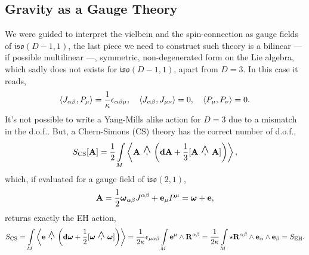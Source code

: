 \documentclass[a0,portrait]{a0poster}
\newcommand{\wedgecomma}{\stackon[1pt]{,}{\smash{\scriptsize$\wedge$}}}
\newcommand{\wedgecomm}[2]{\qty[ #1\ \wedgecomma\ #2 ]}
\begin{document}
\begin{multicols}{2}
\section*{Gravity as a Gauge Theory}

We were guided to interpret the vielbein and the spin-connection as gauge fields of $\mathfrak{iso}(D-1,1)$, the last piece we need 
to construct such theory is a bilinear --- if possible multilinear ---, symmetric, non-degenerated form on the Lie algebra, which sadly does 
not exists for $\mathfrak{iso}(D-1,1)$, apart from $D=3$. In this case it reads,
\[\expval{J_{\alpha\beta},P_\mu}=\frac1\kappa\epsilon_{\alpha\beta\mu},\ \ \ \expval{J_{\alpha\beta},J_{\mu\nu}}=0,\ \ \ \expval{P_\mu,P_\nu}=0.\]
It's not possible to write a Yang-Mills alike action for $D=3$ due to a mismatch in the d.o.f.. But, a Chern-Simons (CS) theory has the correct number of d.o.f.,
\[S_{\textnormal{CS}}\qty[\vb A]=\frac12\int\limits_M\expval{\vb A\ \wedgecomma\ \qty(\vb d{\vb A}+\frac13\wedgecomm{\vb A}{\vb A})},\]
which, if evaluated for a gauge field of $\mathfrak {iso}(2,1)$, \[\vb A = \frac12\boldsymbol\omega_{\alpha\beta}J^{\alpha\beta}+\vb e_\mu P^\mu=\boldsymbol\omega+\vb e,\] returns exactly the EH action,
\[S_{\textnormal{CS}}=\int\limits_M\expval{\vb e\ \wedgecomma\ \qty(\vb d{\boldsymbol\omega}+\frac12\wedgecomm{\boldsymbol\omega}{\boldsymbol\omega})}=\frac{1}{2\kappa}\epsilon_{\mu\alpha\beta}\int\limits_M\vb e^\mu\wedge \vb R^{\alpha\beta}=\frac{1}{2\kappa}\int\limits_M\star\vb R^{\alpha\beta}\wedge \vb e_\alpha\wedge \vb e_\beta=S_{\textnormal{EH}}.\]




\end{multicols}
\end{document}
